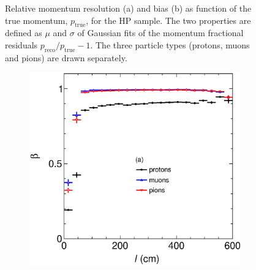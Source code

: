 \begin{figure}[!ht]
\begin{subfigure}[b]{0.49\textwidth}
         \caption{}
         \label{fig:BiasND-GArVSp}
     \end{subfigure}
        \caption{Relative momentum resolution (a) and bias (b) as function of the true momentum, $p_\textrm{true}$, for the HP sample. The two properties are defined as $\mu$ and $\sigma$ of Gaussian fits of the momentum fractional residuals $p_{\text{reco}}/p_{\text{true}}-1$. The three particle types (protons, muons and pions) are drawn separately.}
        \label{fig:ND-GArVSp}
\end{figure}

\begin{figure}[!ht]
     \centering
     \begin{subfigure}[b]{0.49\textwidth}
         \centering
         \includegraphics[width=\textwidth]{figures/ch5-KF_NDGAr/ToySample/HighPres/testNDGArMirrorbetaVSl.eps}
         \caption{}
         \label{fig:betaVSlength}
     \end{subfigure}
     \begin{subfigure}[b]{0.49\textwidth}
         \centering

\end{subfigure}
\end{figure}
